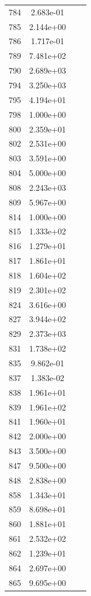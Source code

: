 \documentclass[12pt]{article}
\begin{document}
\begin{longtable}{@{}cccc@{}}
784 & 2.683e-01 &  &  \\
785 & 2.144e+00 &  &  \\
786 & 1.717e-01 &  &  \\
789 & 7.481e+02 &  &  \\
790 & 2.689e+03 &  &  \\
794 & 3.250e+03 &  &  \\
795 & 4.194e+01 &  &  \\
798 & 1.000e+00 &  &  \\
800 & 2.359e+01 &  &  \\
802 & 2.531e+00 &  &  \\
803 & 3.591e+00 &  &  \\
804 & 5.000e+00 &  &  \\
808 & 2.243e+03 &  &  \\
809 & 5.967e+00 &  &  \\
814 & 1.000e+00 &  &  \\
815 & 1.333e+02 &  &  \\
816 & 1.279e+01 &  &  \\
817 & 1.861e+01 &  &  \\
818 & 1.604e+02 &  &  \\
819 & 2.301e+02 &  &  \\
824 & 3.616e+00 &  &  \\
827 & 3.944e+02 &  &  \\
829 & 2.373e+03 &  &  \\
831 & 1.738e+02 &  &  \\
835 & 9.862e-01 &  &  \\
837 & 1.383e-02 &  &  \\
838 & 1.961e+01 &  &  \\
839 & 1.961e+02 &  &  \\
841 & 1.960e+01 &  &  \\
842 & 2.000e+00 &  &  \\
843 & 3.500e+00 &  &  \\
847 & 9.500e+00 &  &  \\
848 & 2.838e+00 &  &  \\
858 & 1.343e+01 &  &  \\
859 & 8.698e+01 &  &  \\
860 & 1.881e+01 &  &  \\
861 & 2.532e+02 &  &  \\
862 & 1.239e+01 &  &  \\
864 & 2.697e+00 &  &  \\
865 & 9.695e+00 &  &  \\

\end{longtable}
\end{document}
